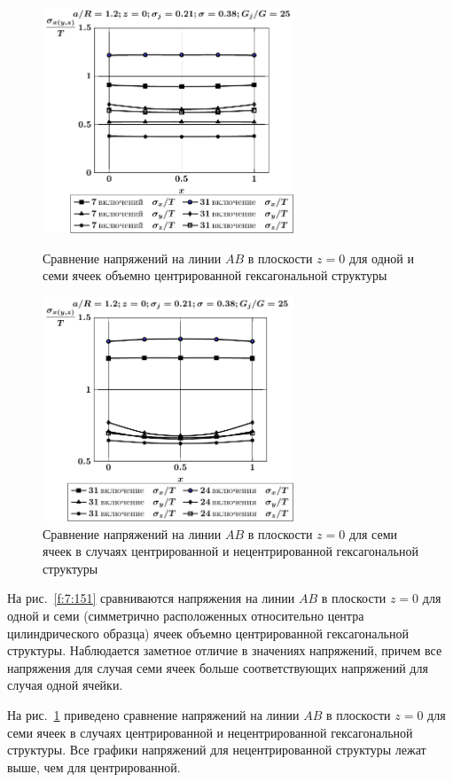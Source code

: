 \begin{figure}[h!]
\centering\footnotesize
\parbox[b]{7.5cm}{\centering\includegraphics[width=7.5cm]{inc31-7-a12-h10-r10-g25-z0.pdf}
\caption{Сравнение напряжений на линии $AB$ в плоскости $z=0$ для одной и семи ячеек объемно центрированной гексагональной структуры
\label{f:7:151}}}\hfil\hfil
\parbox[b]{7.5cm}{\centering\includegraphics[width=7.5cm]{inc31-24-a12-h10-r10-g25-z0.pdf}
\caption{Сравнение напряжений на линии $AB$ в плоскости $z=0$ для семи ячеек в случаях центрированной и нецентрированной гексагональной структуры
\label{f:7:152}}}
\end{figure}

На рис.~\ref{f:7:151} сравниваются напряжения на линии $AB$ в плоскости $z=0$ для одной и семи (симметрично расположенных относительно центра цилиндрического образца) ячеек объемно центрированной гексагональной структуры. Наблюдается заметное отличие в значениях напряжений, причем все напряжения для случая семи ячеек больше соответствующих напряжений для случая одной ячейки.

На рис.~\ref{f:7:152} приведено сравнение напряжений на линии $AB$ в плоскости $z=0$ для семи ячеек в случаях центрированной и нецентрированной гексагональной структуры. Все графики напряжений для нецентрированной структуры лежат выше, чем для центрированной.

